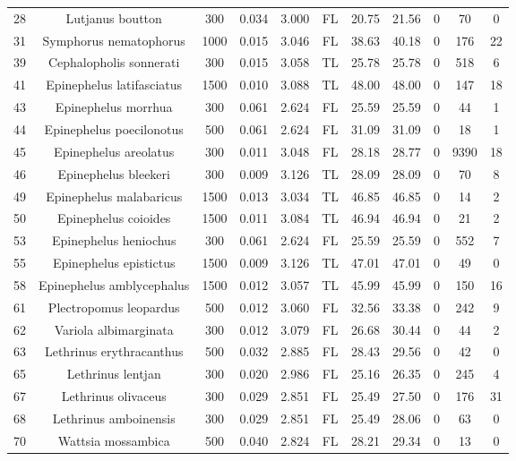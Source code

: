 \documentclass{report}\usepackage[]{graphicx}\usepackage[]{color}
\begin{document}
\begin{table}[ht]
{\begin{tabular}{ccccccccccc}
  28 & Lutjanus boutton & 300 & 0.034 & 3.000 & FL & 20.75 & 21.56 & 0 & 70 & 0 \\ 
  31 & Symphorus nematophorus & 1000 & 0.015 & 3.046 & FL & 38.63 & 40.18 & 0 & 176 & 22 \\ 
  39 & Cephalopholis sonnerati & 300 & 0.015 & 3.058 & TL & 25.78 & 25.78 & 0 & 518 & 6 \\ 
  41 & Epinephelus latifasciatus & 1500 & 0.010 & 3.088 & TL & 48.00 & 48.00 & 0 & 147 & 18 \\ 
  43 & Epinephelus morrhua & 300 & 0.061 & 2.624 & FL & 25.59 & 25.59 & 0 & 44 & 1 \\ 
  44 & Epinephelus poecilonotus & 500 & 0.061 & 2.624 & FL & 31.09 & 31.09 & 0 & 18 & 1 \\ 
  45 & Epinephelus areolatus & 300 & 0.011 & 3.048 & FL & 28.18 & 28.77 & 0 & 9390 & 18 \\ 
  46 & Epinephelus bleekeri & 300 & 0.009 & 3.126 & TL & 28.09 & 28.09 & 0 & 70 & 8 \\ 
  49 & Epinephelus malabaricus & 1500 & 0.013 & 3.034 & TL & 46.85 & 46.85 & 0 & 14 & 2 \\ 
  50 & Epinephelus coioides & 1500 & 0.011 & 3.084 & TL & 46.94 & 46.94 & 0 & 21 & 2 \\ 
  53 & Epinephelus heniochus & 300 & 0.061 & 2.624 & FL & 25.59 & 25.59 & 0 & 552 & 7 \\ 
  55 & Epinephelus epistictus & 1500 & 0.009 & 3.126 & TL & 47.01 & 47.01 & 0 & 49 & 0 \\ 
  58 & Epinephelus amblycephalus & 1500 & 0.012 & 3.057 & TL & 45.99 & 45.99 & 0 & 150 & 16 \\ 
  61 & Plectropomus leopardus & 500 & 0.012 & 3.060 & FL & 32.56 & 33.38 & 0 & 242 & 9 \\ 
  62 & Variola albimarginata & 300 & 0.012 & 3.079 & FL & 26.68 & 30.44 & 0 & 44 & 2 \\ 
  63 & Lethrinus erythracanthus & 500 & 0.032 & 2.885 & FL & 28.43 & 29.56 & 0 & 42 & 0 \\ 
  65 & Lethrinus lentjan & 300 & 0.020 & 2.986 & FL & 25.16 & 26.35 & 0 & 245 & 4 \\ 
  67 & Lethrinus olivaceus & 300 & 0.029 & 2.851 & FL & 25.49 & 27.50 & 0 & 176 & 31 \\ 
  68 & Lethrinus amboinensis & 300 & 0.029 & 2.851 & FL & 25.49 & 28.06 & 0 & 63 & 0 \\ 
  70 & Wattsia mossambica & 500 & 0.040 & 2.824 & FL & 28.21 & 29.34 & 0 & 13 & 0 \\ 

\end{tabular}}
\end{table}
\end{document}
